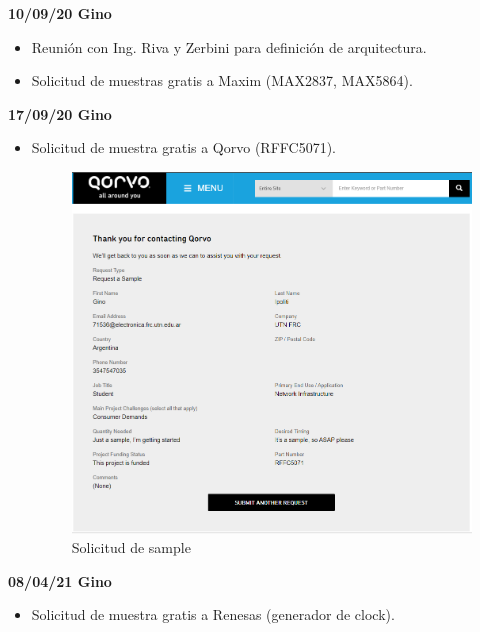 \documentclass[a4paper,12pt]{report} %
\begin{document}
\textbf{10/09/20 Gino}
\begin{itemize}
	\item Reunión con Ing. Riva y Zerbini para definición de arquitectura.
	\item Solicitud de muestras gratis a Maxim (MAX2837, MAX5864).
\end{itemize}
\textbf{17/09/20 Gino}
\begin{itemize}
	\item Solicitud de muestra gratis a Qorvo (RFFC5071).
	\begin{figure}[H]
		\centering
		\includegraphics[scale=0.6]{Imagenes/sample_qorvo}
		\caption{Solicitud de sample}
	\end{figure}
\end{itemize}
\textbf{08/04/21 Gino}
\begin{itemize}
	\item Solicitud de muestra gratis a Renesas (generador de clock).
\end{itemize}






	

\nocite{*}
\end{document}
